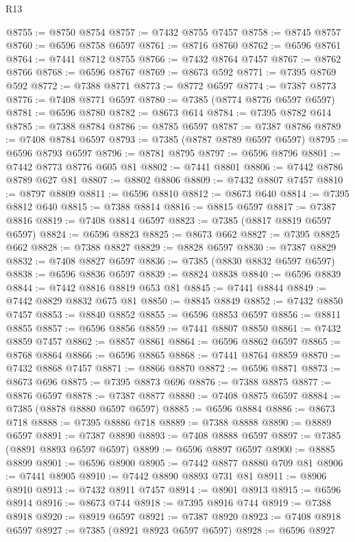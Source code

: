 \begin{lexlean}{R13}
\begin{coremodule}
@8755 := @8750 @8754
@8757 := @7432 @8755 @7457
@8758 := @8745 @8757
@8760 := @6596 @8758 @6597
@8761 := @8716 @8760
@8762 := @6596 @8761
@8764 := @7441 @8712 @8755
@8766 := @7432 @8764 @7457
@8767 := @8762 @8766
@8768 := @6596 @8767
@8769 := @8673 @592
@8771 := @7395 @8769 @592
@8772 := @7388 @8771
@8773 := @8772 @6597
@8774 := @7387 @8773
@8776 := @7408 @8771 @6597
@8780 := @7385 (@8774 @8776 @6597 @6597)
@8781 := @6596 @8780
@8782 := @8673 @614
@8784 := @7395 @8782 @614
@8785 := @7388 @8784
@8786 := @8785 @6597
@8787 := @7387 @8786
@8789 := @7408 @8784 @6597
@8793 := @7385 (@8787 @8789 @6597 @6597)
@8795 := @6596 @8793 @6597
@8796 := @8781 @8795
@8797 := @6596 @8796
@8801 := @7442 @8773 @8776 @605 @81
@8802 := @7441 @8801
@8806 := @7442 @8786 @8789 @627 @81
@8807 := @8802 @8806
@8809 := @7432 @8807 @7457
@8810 := @8797 @8809
@8811 := @6596 @8810
@8812 := @8673 @640
@8814 := @7395 @8812 @640
@8815 := @7388 @8814
@8816 := @8815 @6597
@8817 := @7387 @8816
@8819 := @7408 @8814 @6597
@8823 := @7385 (@8817 @8819 @6597 @6597)
@8824 := @6596 @8823
@8825 := @8673 @662
@8827 := @7395 @8825 @662
@8828 := @7388 @8827
@8829 := @8828 @6597
@8830 := @7387 @8829
@8832 := @7408 @8827 @6597
@8836 := @7385 (@8830 @8832 @6597 @6597)
@8838 := @6596 @8836 @6597
@8839 := @8824 @8838
@8840 := @6596 @8839
@8844 := @7442 @8816 @8819 @653 @81
@8845 := @7441 @8844
@8849 := @7442 @8829 @8832 @675 @81
@8850 := @8845 @8849
@8852 := @7432 @8850 @7457
@8853 := @8840 @8852
@8855 := @6596 @8853 @6597
@8856 := @8811 @8855
@8857 := @6596 @8856
@8859 := @7441 @8807 @8850
@8861 := @7432 @8859 @7457
@8862 := @8857 @8861
@8864 := @6596 @8862 @6597
@8865 := @8768 @8864
@8866 := @6596 @8865
@8868 := @7441 @8764 @8859
@8870 := @7432 @8868 @7457
@8871 := @8866 @8870
@8872 := @6596 @8871
@8873 := @8673 @696
@8875 := @7395 @8873 @696
@8876 := @7388 @8875
@8877 := @8876 @6597
@8878 := @7387 @8877
@8880 := @7408 @8875 @6597
@8884 := @7385 (@8878 @8880 @6597 @6597)
@8885 := @6596 @8884
@8886 := @8673 @718
@8888 := @7395 @8886 @718
@8889 := @7388 @8888
@8890 := @8889 @6597
@8891 := @7387 @8890
@8893 := @7408 @8888 @6597
@8897 := @7385 (@8891 @8893 @6597 @6597)
@8899 := @6596 @8897 @6597
@8900 := @8885 @8899
@8901 := @6596 @8900
@8905 := @7442 @8877 @8880 @709 @81
@8906 := @7441 @8905
@8910 := @7442 @8890 @8893 @731 @81
@8911 := @8906 @8910
@8913 := @7432 @8911 @7457
@8914 := @8901 @8913
@8915 := @6596 @8914
@8916 := @8673 @744
@8918 := @7395 @8916 @744
@8919 := @7388 @8918
@8920 := @8919 @6597
@8921 := @7387 @8920
@8923 := @7408 @8918 @6597
@8927 := @7385 (@8921 @8923 @6597 @6597)
@8928 := @6596 @8927

\end{coremodule}
\end{lexlean}
